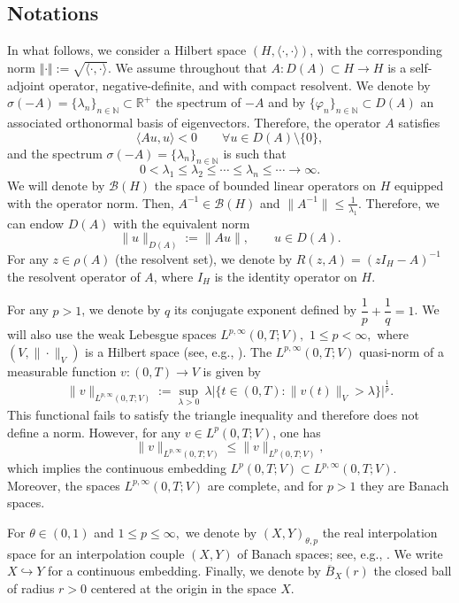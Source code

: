 \documentclass[reqno]{amsart}
\numberwithin{equation}{section}
\begin{document}
\subsection*{Notations}
In what follows, we consider a Hilbert space $(H,\langle \cdot,\cdot \rangle)$, with the corresponding norm $\Vert\cdot\Vert:=\sqrt{\langle \cdot,\cdot \rangle}$. We assume throughout that $A:D(A)\subset H\rightarrow H$ is a self-adjoint operator, negative-definite, and with compact resolvent. We denote by $\sigma(-A) = \{\lambda_n\}_{n\in \mathbb{N}}\subset \mathbb{R}^{+}$ the spectrum of $-A$ and by $\{\varphi_n\}_{n\in \mathbb{N}}\subset D(A)$ an associated orthonormal basis of eigenvectors. Therefore, the operator $A$ satisfies
$$\langle Au,u \rangle <0 \qquad \forall u\in D(A)\setminus \{0\},$$
and the spectrum $\sigma(-A) = \{\lambda_n\}_{n\in \mathbb{N}}$ is such that
$$0<\lambda_1 \le \lambda_2 \le \cdots \le \lambda_n \le \cdots\to \infty.$$
We will denote by \(\mathcal{B}(H)\) the space of bounded linear operators on $H$ equipped with the operator norm. Then, $A^{-1}\in \mathcal{B}(H)$ and $\|A^{-1}\|\le \frac{1}{\lambda_1}$. Therefore, we can endow $D(A)$ with the equivalent norm
$$\|u\|_{D(A)}:=\|A u\|, \qquad  u\in D(A).$$
For any $z\in \rho(A)$ (the resolvent set), we denote by $R(z,A)=(z I_H-A)^{-1}$ the resolvent operator of $A$, where $I_H$ is the identity operator on $H$.

For any $p>1$, we denote by $q$ its conjugate exponent defined by $\dfrac{1}{p} + \dfrac{1}{q} = 1$. We will also use the weak Lebesgue spaces $L^{p,\infty}(0,T;V),$ $1 \le p < \infty,$ where $(V,\|\cdot\|_V)$ is a Hilbert space (see, e.g., \cite[Section 1.18.6]{Tr78}). The $L^{p,\infty}(0,T;V)$ quasi-norm of a measurable function $v : (0,T) \to V$ is given by
\[
\|v\|_{L^{p,\infty}(0,T;V)} := \sup_{\lambda>0} \, \lambda\Big|\Big\{ t\in (0,T)\colon \|v(t)\|_V>\lambda \Big\}\Big|^{\frac{1}{p}}.
\]
This functional fails to satisfy the triangle inequality and therefore does not
define a norm. However, for any $v \in L^p(0,T;V)$, one has
\[
\|v\|_{L^{p,\infty}(0,T;V)} \le \|v\|_{L^p(0,T;V)},
\]
which implies the continuous embedding $L^p(0,T;V) \subset L^{p,\infty}(0,T;V)$. Moreover, the spaces $L^{p,\infty}(0,T;V)$ are complete, and for $p>1$ they are Banach spaces.

For $\theta\in (0,1)$ and $1\leq p \leq \infty,$ we denote by $(X,Y)_{\theta,p}$ the real interpolation space for an interpolation couple $(X, Y)$ of Banach spaces; see, e.g., \cite[Section 1.5]{Tr78}. We write $X \hookrightarrow Y$ for a continuous embedding. Finally, we denote by $\overline{B}_X(r)$ the closed ball of radius $r>0$ centered at the origin in the space $X$.
\end{document}
